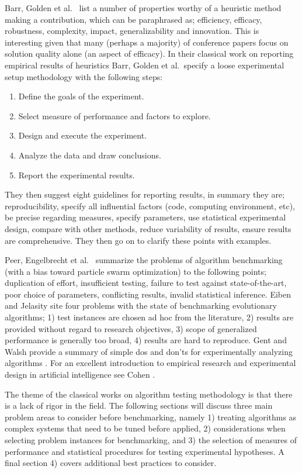 Barr, Golden et al.\ \cite{Barr1995} list a number of properties worthy of a heuristic method making a contribution, which can be paraphrased as; efficiency, efficacy, robustness, complexity, impact, generalizability and innovation. This is interesting given that many (perhaps a majority) of conference papers focus on solution quality alone (an aspect of efficacy).
In their classical work on reporting empirical results of heuristics Barr, Golden et al.\ specify a loose experimental setup methodology with the following steps:

\begin{enumerate}
	\item Define the goals of the experiment.
	\item Select measure of performance and factors to explore.
	\item Design and execute the experiment.
	\item Analyze the data and draw conclusions.
	\item Report the experimental results.
\end{enumerate}

They then suggest eight guidelines for reporting results, in summary they are; reproducibility, specify all influential factors (code, computing environment, etc), be precise regarding measures, specify parameters, use statistical experimental design, compare with other methods, reduce variability of results, ensure results are comprehensive. They then go on to clarify these points with examples.

Peer, Engelbrecht et al.\ \cite{Peer2003} summarize the problems of algorithm benchmarking (with a bias toward particle swarm optimization) to the following points; duplication of effort, insufficient testing, failure to test against state-of-the-art, poor choice of parameters, conflicting results, invalid statistical inference. Eiben and Jelasity \cite{Eiben2002} site four problems with the state of benchmarking evolutionary algorithms; 1) test instances are chosen ad hoc from the literature, 2) results are provided without regard to research objectives, 3) scope of generalized performance is generally too broad, 4) results are hard to reproduce.
Gent and Walsh provide a summary of simple dos and don'ts for experimentally analyzing algorithms \cite{Gent1994}. For an excellent introduction to empirical research and experimental design in artificial intelligence see Cohen \cite{Cohen1995}.

The theme of the classical works on algorithm testing methodology is that there is a lack of rigor in the field. The following sections will discuss three main problem areas to consider before benchmarking, namely 1) treating algorithms as complex systems that need to be tuned before applied, 2) considerations when selecting problem instances for benchmarking, and 3) the selection of measures of performance and statistical procedures for testing experimental hypotheses. A final section 4) covers additional best practices to consider.


